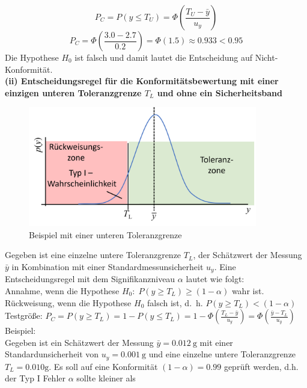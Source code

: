 \[P_C = P(y \le T_U) =  
\Phi \left(\frac{T_U - \bar y}{u_y}\right)
\]
\[P_C =   \Phi \left(\frac{3.0 - 2.7}{0.2}\right) = \Phi(1.5) \approx 0.933 < 0.95 
\]
Die Hypothese $H_0$ ist falsch und damit lautet die Entscheidung auf Nicht-Konformität.\\
\textbf{(ii) Entscheidungsregel für die Konformitätsbewertung mit einer einzigen unteren Toleranzgrenze $T_L$ und ohne ein Sicherheitsband} \\[2ex]
\begin{figure}[!htb]
	\begin{center}
		\includegraphics[width=100mm]{06_vorlesung/media/Einzelne_Untere_Toleranz.png}
		\caption{Beispiel mit einer unteren Toleranzgrenze}
		\label{fig:Beispiel_Toleranz_untere_Toleranzgrenze}
	\end{center}
\end{figure}
Gegeben ist eine einzelne untere Toleranzgrenze $T_L$, der Schätzwert der Messung $\bar y$ in Kombination mit einer Standardmessunsicherheit $u_y$. Eine Entscheidungsregel mit dem Signifikanzniveau $\alpha$ lautet wie folgt:\\
\hspace*{2em} Annahme, wenn die Hypothese 
$H_0: \; P(y \ge T_L) \ge (1 - \alpha)$  wahr ist. \newline
\hspace*{2em} Rückweisung, wenn die Hypothese $H_0$ falsch ist, d.~h.  $P(y \ge T_L) < (1 - \alpha)$ \newline
\hspace*{2em} Testgröße: $P_C = P(y \ge T_L) =  1- P(y \le T_L) = 
1- \Phi \left(\frac{T_L - \bar y}{u_y}\right) = \Phi \left(\frac{\bar y-T_L}{u_y}\right)$ \newline
Beispiel:\\
Gegeben ist ein Schätzwert der Messung $\bar y=0.012~\mathrm{g}$ mit einer Standardunsicherheit von $u_y=0.001~\mathrm{g}$ und 
eine einzelne untere Toleranzgrenze $T_L=0.010 \mathrm{g}$. Es soll auf eine Konformität $(1-\alpha)=0.99$ geprüft werden, d.h. der Typ I Fehler $\alpha$ sollte kleiner als 
